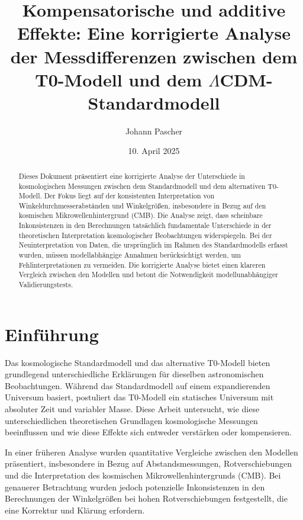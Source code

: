 \documentclass[a4paper,12pt]{article}
\newcommand{\LCDM}{\ensuremath{\Lambda}CDM}
\begin{document}
	
	\title{Kompensatorische und additive Effekte: Eine korrigierte Analyse der Messdifferenzen zwischen dem T0-Modell und dem \LCDM-Standardmodell}
	\author{Johann Pascher}
	\date{10. April 2025}
	\maketitle
	
	\begin{abstract}
		Dieses Dokument präsentiert eine korrigierte Analyse der Unterschiede in kosmologischen Messungen zwischen dem Standardmodell \cite{Planck2018} und dem alternativen T0-Modell. Der Fokus liegt auf der konsistenten Interpretation von Winkeldurchmesserabständen und Winkelgrößen, insbesondere in Bezug auf den kosmischen Mikrowellenhintergrund (CMB). Die Analyse zeigt, dass scheinbare Inkonsistenzen in den Berechnungen tatsächlich fundamentale Unterschiede in der theoretischen Interpretation kosmologischer Beobachtungen widerspiegeln. Bei der Neuinterpretation von Daten, die ursprünglich im Rahmen des Standardmodells \cite{Planck2018} erfasst wurden, müssen modellabhängige Annahmen berücksichtigt werden, um Fehlinterpretationen zu vermeiden. Die korrigierte Analyse bietet einen klareren Vergleich zwischen den Modellen und betont die Notwendigkeit modellunabhängiger Validierungstests.
	\end{abstract}
	
	\tableofcontents
	\newpage
	
	\section{Einführung}
	
	Das kosmologische Standardmodell \cite{Planck2018} und das alternative T0-Modell bieten grundlegend unterschiedliche Erklärungen für dieselben astronomischen Beobachtungen. Während das Standardmodell \cite{Planck2018} auf einem expandierenden Universum basiert, postuliert das T0-Modell ein statisches Universum mit absoluter Zeit und variabler Masse. Diese Arbeit untersucht, wie diese unterschiedlichen theoretischen Grundlagen kosmologische Messungen beeinflussen und wie diese Effekte sich entweder verstärken oder kompensieren.
	
	In einer früheren Analyse \cite{Pascher2025a} wurden quantitative Vergleiche zwischen den Modellen präsentiert, insbesondere in Bezug auf Abstandsmessungen, Rotverschiebungen und die Interpretation des kosmischen Mikrowellenhintergrunds (CMB). Bei genauerer Betrachtung wurden jedoch potenzielle Inkonsistenzen in den Berechnungen der Winkelgrößen bei hohen Rotverschiebungen festgestellt, die eine Korrektur und Klärung erfordern.
	
\end{document}
